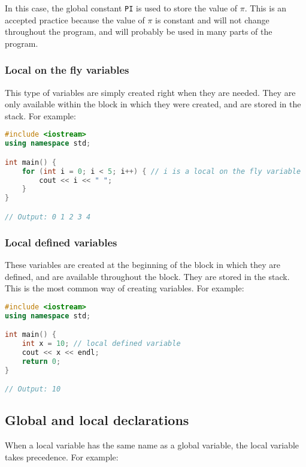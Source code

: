 In this case, the global constant \texttt{PI} is used to store the value of $\pi$. This is an accepted practice because
the value of $\pi$ is constant and will not change throughout the program, and will probably be used in many parts 
of the program.

\subsubsection{Local on the fly variables}

This type of variables are simply created right when they are needed. They are only available within the block in which
they were created, and are stored in the stack. For example:\\

\begin{lstlisting}[language=C++]
#include <iostream>
using namespace std;

int main() {
    for (int i = 0; i < 5; i++) { // i is a local on the fly variable
        cout << i << " ";
    }
}

// Output: 0 1 2 3 4
\end{lstlisting}

\subsubsection{Local defined variables}

These variables are created at the beginning of the block in which they are defined, and are available throughout the block.
They are stored in the stack. This is the most common way of creating variables. For example:\\

\begin{lstlisting}[language=C++]
#include <iostream>
using namespace std;

int main() {
    int x = 10; // local defined variable
    cout << x << endl;
    return 0;
}

// Output: 10
\end{lstlisting}

\subsection{Global and local declarations}

When a local variable has the same name as a global variable, the local variable takes precedence. For example:\\


